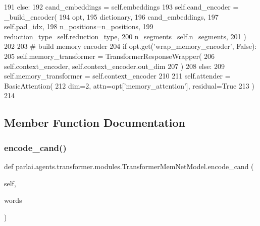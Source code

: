 \begin{DoxyCode}
191             \textcolor{keywordflow}{else}:
192                 cand\_embeddings = self.embeddings
193             self.cand\_encoder = \_build\_encoder(
194                 opt,
195                 dictionary,
196                 cand\_embeddings,
197                 self.pad\_idx,
198                 n\_positions=n\_positions,
199                 reduction\_type=self.reduction\_type,
200                 n\_segments=self.n\_segments,
201             )
202 
203         \textcolor{comment}{# build memory encoder}
204         \textcolor{keywordflow}{if} opt.get(\textcolor{stringliteral}{'wrap\_memory\_encoder'}, \textcolor{keyword}{False}):
205             self.memory\_transformer = TransformerResponseWrapper(
206                 self.context\_encoder, self.context\_encoder.out\_dim
207             )
208         \textcolor{keywordflow}{else}:
209             self.memory\_transformer = self.context\_encoder
210 
211         self.attender = BasicAttention(
212             dim=2, attn=opt[\textcolor{stringliteral}{'memory\_attention'}], residual=\textcolor{keyword}{True}
213         )
214 
\end{DoxyCode}


\subsection{Member Function Documentation}
\mbox{\label{classparlai_1_1agents_1_1transformer_1_1modules_1_1TransformerMemNetModel_a1e39cdf6357c9e8dd9f90e7f351e42a1}} 
\subsubsection{\texorpdfstring{encode\+\_\+cand()}{encode\_cand()}}
{\footnotesize\ttfamily def parlai.\+agents.\+transformer.\+modules.\+Transformer\+Mem\+Net\+Model.\+encode\+\_\+cand (\begin{DoxyParamCaption}\item[{}]{self,  }\item[{}]{words }\end{DoxyParamCaption})}


